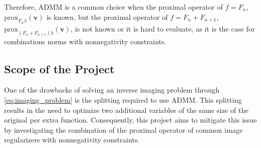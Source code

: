 Therefore, ADMM is a common choice when the proximal operator of $f = F_n$,  $\mathrm{prox}_{ F_n\lambda}(\mathbf{v})$ is known, but the proximal operator of $f = F_n +F_{n+1}$, $\mathrm{prox}_{(F_n+F_{n+1})\lambda}(\mathbf{v})$, is not known or it is hard to evaluate, as it is the case for combinations norms with nonnegativity constraints.





\subsection{Scope of the Project} \label{sect:1.scope}

One of the drawbacks of solving an inverse imaging problem through  \eqref{eq:imaging_problem} is the splitting required to use ADMM. This splitting results in the need to optimize two additional variables of the same size of the original per extra function. Consequently, this project aims to mitigate this issue by investigating the combination of the proximal operator of common image regularizers with nonnegativity constraints. 

